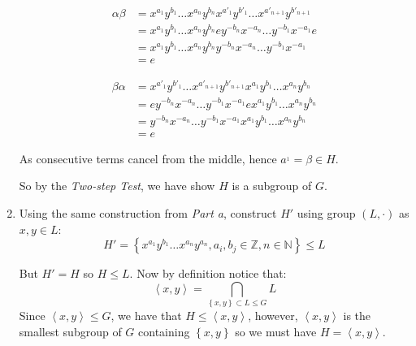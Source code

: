 \documentclass[a4paper, 11pt]{article}
\newcommand{\NN}{\mathbb{N}}
\newcommand{\ZZ}{\mathbb{Z}}
\def\set#1{\left\{ #1 \right\}}
\def\gen#1{\left\langle#1 \right\rangle}
\begin{document}
\begin{enumerate}[label=(\alph*)]
\begin{mdframed}
		\begin{minipage}{0.5\linewidth}
			\begin{align*}
				\alpha \beta 
				&= x^{a_1}y^{b_1}\dots x^{a_n}y^{b_n}
				x^{a'_1}y^{b'_1}\dots x^{a'_{n+1}}y^{b'_{n+1}}	\\
				&= x^{a_1}y^{b_1}\dots x^{a_n}y^{b_n}
				ey^{-b_n}x^{-a_n}\dots y^{-b_1}x^{-a_1}e	\\
				&= x^{a_1}y^{b_1}\dots x^{a_n}y^{b_n}
				y^{-b_n}x^{-a_n}\dots y^{-b_1}x^{-a_1}	\\
				&= e 
			\end{align*}
		\end{minipage}
		\begin{minipage}{0.5\linewidth}
			\begin{align*}
				\beta\alpha 
				&= x^{a'_1}y^{b'_1}\dots x^{a'_{n+1}}y^{b'_{n+1}}	
				x^{a_1}y^{b_1}\dots x^{a_n}y^{b_n} \\
				&= ey^{-b_n}x^{-a_n}\dots y^{-b_1}x^{-a_1}e	
				x^{a_1}y^{b_1}\dots x^{a_n}y^{b_n} \\
				&= y^{-b_n}x^{-a_n}\dots y^{-b_1}x^{-a_1}	
				x^{a_1}y^{b_1}\dots x^{a_n}y^{b_n} \\
				&= e 
			\end{align*}
		\end{minipage}
		As consecutive terms cancel from the middle, hence $a^{_1}=\beta \in H$.
	\end{mdframed}		
	So by the \textit{Two-step Test}, we have show $H$ is a subgroup of $G$. 

	\item Using the same construction from \textit{Part a}, construct $H'$ using group $(L,\cdot)$ as $x,y\in L$:
	\[
		H' = \set{x^{a_1}y^{b_1} \dots x^{a_n}y^{a_n},a_i,b_j\in\ZZ, n\in\NN}	\leq L 
	\]
	
	But $H'=H$ so $H\leq L$. Now by definition notice that: 
	\[
		\gen{x,y} = \bigcap_{\set{x,y}\subset L \leq G}L	
	\]
	Since $\gen{x,y}\leq G$, we have that $H\leq \gen{x,y}$, however, $\gen{x,y}$ is the smallest subgroup of $G$ containing $\set{x,y}$ so we must have $H=\gen{x,y}$. 


\end{enumerate}
\end{document}
